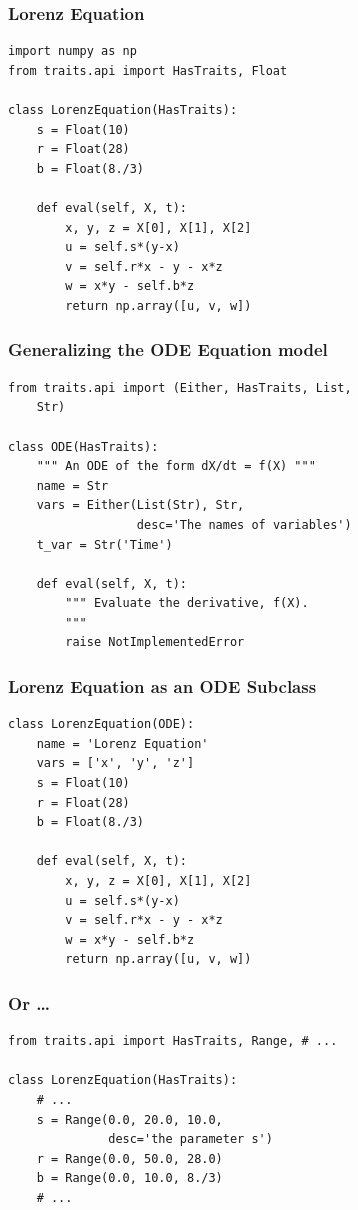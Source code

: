 \documentclass[14pt,compress]{beamer}
\begin{document}
\begin{frame}
    \frametitle{Lorenz Equation}
\small
\begin{lstlisting}
import numpy as np
from traits.api import HasTraits, Float

class LorenzEquation(HasTraits):
    s = Float(10)
    r = Float(28)
    b = Float(8./3)
    
    def eval(self, X, t):
        x, y, z = X[0], X[1], X[2]
        u = self.s*(y-x)
        v = self.r*x - y - x*z
        w = x*y - self.b*z
        return np.array([u, v, w])
\end{lstlisting}
\end{frame}

\begin{frame}
\frametitle{Generalizing the ODE Equation model}
\small
\begin{lstlisting}
from traits.api import (Either, HasTraits, List, 
    Str)

class ODE(HasTraits):
    """ An ODE of the form dX/dt = f(X) """
    name = Str
    vars = Either(List(Str), Str, 
                  desc='The names of variables')
    t_var = Str('Time')

    def eval(self, X, t):
        """ Evaluate the derivative, f(X). 
        """
        raise NotImplementedError
\end{lstlisting}
\end{frame}


\begin{frame}
\frametitle{Lorenz Equation as an ODE Subclass}
\small
\begin{lstlisting}
class LorenzEquation(ODE):
    name = 'Lorenz Equation'
    vars = ['x', 'y', 'z']
    s = Float(10)
    r = Float(28)
    b = Float(8./3)

    def eval(self, X, t):
        x, y, z = X[0], X[1], X[2]
        u = self.s*(y-x)
        v = self.r*x - y - x*z
        w = x*y - self.b*z
        return np.array([u, v, w])
\end{lstlisting}
\end{frame}

\begin{frame}
    \frametitle{Or \dots}
\small
\begin{lstlisting}
from traits.api import HasTraits, Range, # ...

class LorenzEquation(HasTraits):
    # ...
    s = Range(0.0, 20.0, 10.0, 
              desc='the parameter s')
    r = Range(0.0, 50.0, 28.0)
    b = Range(0.0, 10.0, 8./3)
    # ...
\end{lstlisting}
\end{frame}
\end{document}
